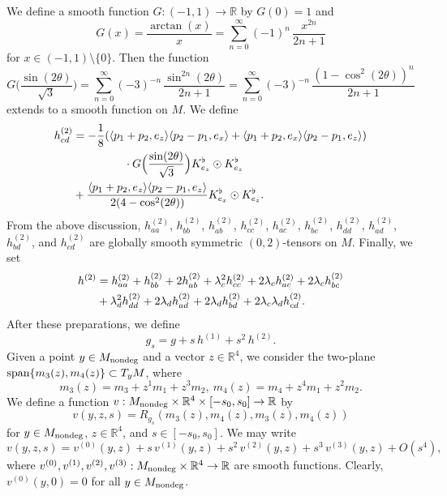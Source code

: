 \documentclass[11pt]{amsart}
\theoremstyle{definition}
\begin{document}
We define a smooth function $G: (-1,1) \to \mathbb{R}$ by $G(0)=1$ and 
\[G(x) = \frac{\arctan(x)}{x} = \sum_{n=0}^\infty (-1)^n \, \frac{x^{2n}}{2n+1}\] 
for $x \in (-1,1) \setminus \{0\}$. Then the function 
\[G \Big ( \frac{\sin(2\theta)}{\sqrt{3}} \Big ) = \sum_{n=0}^\infty (-3)^{-n} \, \frac{\sin^{2n}(2\theta)}{2n+1} = \sum_{n=0}^\infty (-3)^{-n} \, \frac{(1-\cos^2(2\theta))^n}{2n+1}\] 
extends to a smooth function on $M$. We define
\begin{align*}
h^{(2)}_{cd} 
&=-\frac{1}{8} (\langle p_1+p_2,e_z  \rangle\langle p_2-p_1,e_x  \rangle+\langle p_1+p_2,e_x  \rangle\langle p_2-p_1,e_z  \rangle) \\ 
&\hspace{16mm} \cdot G \Big ( \frac{\sin(2\theta)}{\sqrt{3}} \Big ) K^\flat_{e_z}\odot K^\flat_{e_z}\\
&+\frac{\langle p_1+p_2,e_z  \rangle\langle p_2-p_1,e_z  \rangle}{2(4-\cos^2(2\theta))}K^\flat_{e_x}\odot K^\flat_{e_z}.
\end{align*}
From the above discussion, $h^{(2)}_{aa}$, $h^{(2)}_{bb}$, $h^{(2)}_{ab}$, $h^{(2)}_{cc}$, $h^{(2)}_{ac}$, $h^{(2)}_{bc}$, $h^{(2)}_{dd}$, $h^{(2)}_{ad}$, $h^{(2)}_{bd}$, and $h^{(2)}_{cd}$ are globally smooth symmetric $(0,2)$-tensors on $M$.
Finally, we set
\begin{align}\label{def.h2}
h^{(2)} 
&=h^{(2)}_{aa}+h^{(2)}_{bb}+2 h^{(2)}_{ab}+\lambda_c^2h^{(2)}_{cc}+2\lambda_c h^{(2)}_{ac}+2\lambda_c h^{(2)}_{bc} \notag \\ 
&+\lambda_d^2 h^{(2)}_{dd}+2\lambda_d h^{(2)}_{ad}+2\lambda_d h^{(2)}_{bd}+2\lambda_c\lambda_d h^{(2)}_{cd}.
\end{align}
After these preparations, we define 
\[g_s = g + s \, h^{(1)} + s^2 \, h^{(2)}.\] 
Given a point $y \in M_{\text{\rm nondeg}}$ and a vector $z \in \mathbb{R}^4$, we consider the two-plane $\text{\rm span}\{m_3(z),m_4(z)\} \subset T_y M$, where 
\[ m_3(z)=m_3+z^1 m_1+z^3 m_2,\ m_4(z)=m_4+z^4 m_1+z^2 m_2. \] 
We define a function $v: M_{\text{\rm nondeg}} \times \mathbb{R}^4 \times [-s_0,s_0] \to \mathbb{R}$ by 
\[v(y,z,s) = R_{g_s}(m_3(z),m_4(z),m_3(z),m_4(z))\] 
for $y \in M_{\text{\rm nondeg}}$, $z \in \mathbb{R}^4$, and $s \in [-s_0,s_0]$. We may write 
\begin{equation} 
\label{Taylor.expansion.of.v}
v(y,z,s) = v^{(0)}(y,z) + s \, v^{(1)}(y,z) + s^2 \, v^{(2)}(y,z) + s^3 \, v^{(3)}(y,z) + O(s^4), 
\end{equation}
where $v^{(0)},v^{(1)},v^{(2)},v^{(3)}: M_{\text{\rm nondeg}} \times \mathbb{R}^4 \to \mathbb{R}$ are smooth functions. Clearly, $v^{(0)}(y,0) = 0$ for all $y \in M_{\text{\rm nondeg}}$.
\end{document}
